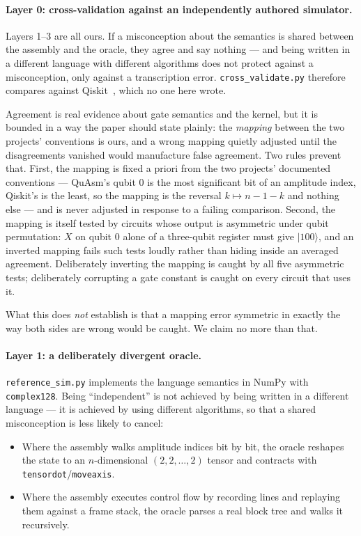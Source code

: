 \documentclass[11pt]{article}
\newcommand{\quasm}{QuAsm}
\newcommand{\ket}[1]{\ensuremath{|#1\rangle}}
\begin{document}
\paragraph{Layer 0: cross-validation against an independently authored simulator.}
Layers 1--3 are all ours. If a misconception about the semantics is shared between the
assembly and the oracle, they agree and say nothing --- and being written in a different
language with different algorithms does not protect against a misconception, only against a
transcription error. \texttt{cross\_validate.py} therefore compares against
Qiskit~\cite{qiskit}, which no one here wrote.

Agreement is real evidence about gate semantics and the kernel, but it is bounded in a way
the paper should state plainly: the \emph{mapping} between the two projects' conventions is
ours, and a wrong mapping quietly adjusted until the disagreements vanished would
manufacture false agreement. Two rules prevent that. First, the mapping is fixed a priori
from the two projects' documented conventions --- \quasm{}'s qubit 0 is the most
significant bit of an amplitude index, Qiskit's is the least, so the mapping is the
reversal $k \mapsto n-1-k$ and nothing else --- and is never adjusted in response to a
failing comparison. Second, the mapping is itself tested by circuits whose output is
asymmetric under qubit permutation: $X$ on qubit 0 alone of a three-qubit register must
give \ket{100}, and an inverted mapping fails such tests loudly rather than hiding inside
an averaged agreement. Deliberately inverting the mapping is caught by all five asymmetric
tests; deliberately corrupting a gate constant is caught on every circuit that uses it.

What this does \emph{not} establish is that a mapping error symmetric in exactly the way
both sides are wrong would be caught. We claim no more than that.

\paragraph{Layer 1: a deliberately divergent oracle.} \texttt{reference\_sim.py} implements
the language semantics in NumPy with \texttt{complex128}. Being ``independent'' is not
achieved by being written in a different language --- it is achieved by using different
algorithms, so that a shared misconception is less likely to cancel:

\begin{itemize}
  \item Where the assembly walks amplitude indices bit by bit, the oracle reshapes the state
    to an $n$-dimensional $(2,2,\ldots,2)$ tensor and contracts with
    \texttt{tensordot}/\texttt{moveaxis}.
  \item Where the assembly executes control flow by recording lines and replaying them
    against a frame stack, the oracle parses a real block tree and walks it recursively.
\end{itemize}
\end{document}
